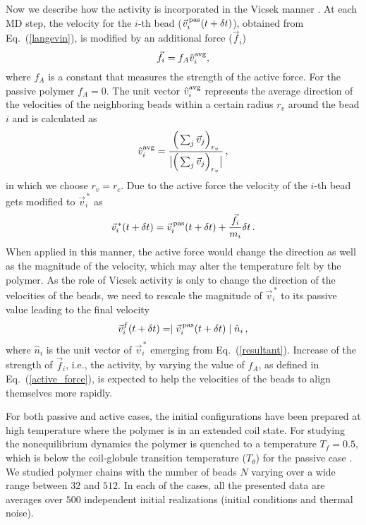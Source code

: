 \documentclass[aps,prx,reprint,showpacs,showkeys,noeprint,longbibliography]{revtex4-1} %
\begin{document}
\par
Now we describe how the activity is incorporated in the 
Vicsek manner \cite{vicsek, das1, skdas14, trefz16,paul1}.
At each MD step, the velocity for the $i$-th bead ($\vec{v}_i^{\,\rm{pas}}(t+\delta t)$), obtained from Eq.~(\ref{langevin}), is modified by an additional force ($\vec{f}_i$)
\begin{equation}\label{active_force}
 \vec{f}_i = f_A \hat{v}_i^{\rm{avg}} ,
\end{equation}
where $f_A$ is a constant that measures the strength of the active force. 
 For the passive polymer $f_A=0$. 
The unit vector $\hat{v}_i^{\rm{avg}}$ represents the average direction of the velocities of the neighboring 
beads within a certain radius $r_v$ around the bead $i$ and is calculated 
as 
\begin{equation}\label{neighbor}
 \hat{v}_i^{\rm{avg}} = \frac{\Big(\sum_j \vec{v}_j\Big)_{r_v}}{\big|\Big(\sum_j \vec{v}_j\Big)_{r_v}\big|}\,,
\end{equation}
 in which we choose $r_v=r_c$. Due to the active force the velocity of the $i$-th bead gets modified to $\vec{v}_i^{\,*}$ as
 \begin{equation}\label{resultant}
  \vec{v}_i^{{\,*}}(t+\delta t) = \vec{v}_i^{\,\rm{pas}}(t+\delta t) + \frac{\vec{f}_i}{m_i} \delta t\,.
 \end{equation}
When applied in this manner, the active force would change the direction as well as the magnitude of the velocity, which may alter the temperature 
felt by the polymer. As the role of Vicsek activity \cite{vicsek} is only to change  the direction of the velocities of the beads, we need to rescale the magnitude of $\vec{v}_i^{\,*}$ to its passive value leading to the final velocity  \cite{das1}
\begin{equation}
 \vec{v}_i^{{f}}(t+\delta t) = \mid \vec{v}_i^{\,\rm{pas}}(t+\delta t) \mid\hat{n}_i\,,
\end{equation}
where $\hat{n}_i$ is the unit vector of $\vec{v}_i^{{\,*}}$ emerging from  Eq.~(\ref{resultant}).
Increase of the strength of $\vec{f}_i$, i.e., the activity, by varying the value of $f_A$, as defined in  Eq.~(\ref{active_force}), is expected to help the velocities of the beads to align themselves more rapidly. 
\par
For both passive and active cases, the initial configurations have been prepared at high temperature where the polymer is in an extended coil state. 
For studying the nonequilibrium dynamics the polymer is quenched to a temperature $T_f=0.5$, which is below the coil-globule transition temperature ($T_{\theta}$) for the passive case \cite{majumder3}. We studied polymer chains with the number of beads $N$ varying over a wide range between $32$ and $512$. In   each of the cases, all the presented data are averages  over $500$ independent initial realizations (initial conditions and thermal noise).
\end{document}
